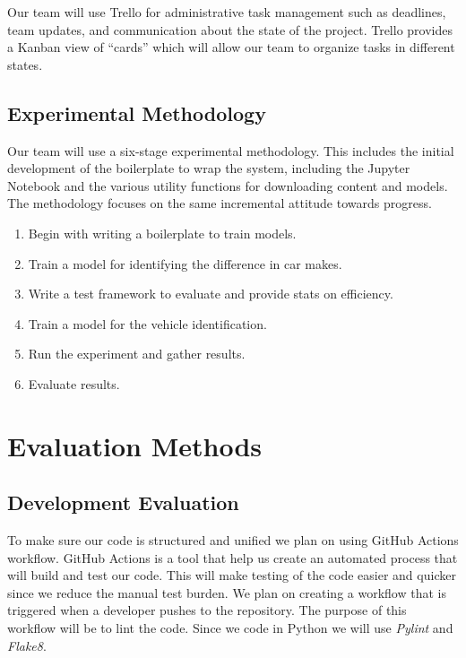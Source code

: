 \documentclass[12pt,twoside]{article}
\begin{document}
Our team will use Trello for administrative task management such as deadlines, team updates, and communication about the state of the project. Trello provides a Kanban view of ``cards'' which will allow our team to organize tasks in different states.

\subsection{Experimental Methodology}
Our team will use a six-stage experimental methodology. This includes the initial development of the boilerplate to wrap the system, including the Jupyter Notebook and the various utility functions for downloading content and models. The methodology focuses on the same incremental attitude towards progress.

\begin{enumerate}
    \itemsep0em 
    \item Begin with writing a boilerplate to train models.
    \item Train a model for identifying the difference in car makes.
    \item Write a test framework to evaluate and provide stats on efficiency.
    \item Train a model for the vehicle identification.
    \item Run the experiment and gather results.
    \item Evaluate results.
\end{enumerate}

\section{Evaluation Methods}
\subsection{Development Evaluation}
To make sure our code is structured and unified we plan on using GitHub Actions workflow.\cite{githubWorkflows} GitHub Actions is a tool that help us create an automated process that will build and test our code. This will make testing of the code easier and quicker since we reduce the manual test burden. We plan on creating a workflow that is triggered when a developer pushes to the repository. The purpose of this workflow will be to lint the code. Since we code in Python we will use \textit{Pylint} and \textit{Flake8}.\cite{linting}\\
\end{document}
